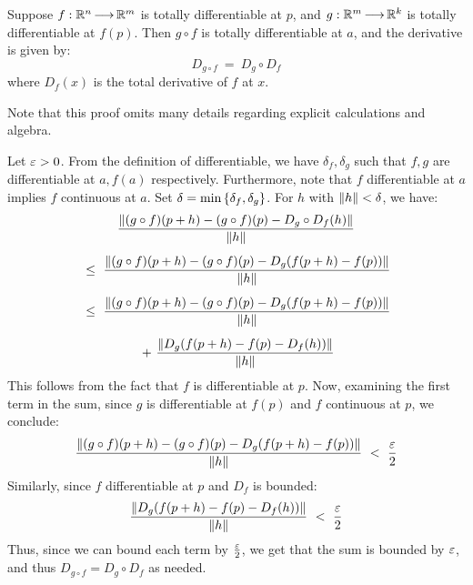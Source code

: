 \newpage
\begin{thm}[num=7.1,title=Chain Rule]
    Suppose $ f:\mathbb{R}^{n} \operatorname{\longrightarrow} \mathbb{R}^{m} $ is totally differentiable at $ p $,
    and $ g:\mathbb{R}^{m} \operatorname{\longrightarrow} \mathbb{R}^{k} $ is totally differentiable at $ f(p) $. \vsp
    Then $ g \circ f $ is totally differentiable at $ a $, and the derivative is
    given by:
    \begin{equation*}
        D_{g\circ f} \ = \ D_{g} \circ D_{f}
    \end{equation*}
    where $ D_{f}(x) $ is the total derivative of $ f $ at $ x $.
\end{thm}

Note that this proof omits many details regarding explicit calculations and
algebra.
\begin{pf}
    Let $ \operatorname{\varepsilon} > 0 $. From the definition of differentiable, we have
    $ \delta_{f}, \delta_{g} $ such that $ f, g $ are differentiable at $ a,
    f(a) $ respectively. Furthermore, note that $ f $ differentiable at $ a $
    implies $ f $ continuous at $ a $. \vsp
    Set $ \delta = \min\left\{{\delta_{f},\delta_{g}}\right\} $. For $ h $ with $ \left\|h\right\|
    < \delta $, we have:
    \begin{gather*}
        \frac{\norm{(g\circ f)(p+h)-(g\circ f)(p)-D_{g}\circ D_{f}(h)}}
        {\norm{h}} \vsp
        \ \leq \ \frac{\norm{(g\circ f)(p+h)-(g\circ f)(p)-D_{g}(f(p+h)-f(p))}}
        {\norm{h}} \vsp
        \ \leq \ \frac{\norm{(g\circ f)(p+h)-(g\circ f)(p)-D_{g}(f(p+h)-f(p))}}
        {\norm{h}} \vsp
        \ + \ \frac{\norm{D_{g}(f(p+h)-f(p) - D_{f}(h))}}{\norm{h}}
    \end{gather*}
    This follows from the fact that $ f $ is differentiable at $ p $. Now,
    examining the first term in the sum, since $ g $ is differentiable at
    $ f(p) $ and $ f $ continuous at $ p $, we conclude:
    \begin{equation*}
        \frac{\left\|(g\circ f)(p+h)-(g\circ f)(p)-D_{g}(f(p+h)-f(p))\right\|}
        {\left\|h\right\|} \ < \ \frac{\operatorname{\varepsilon}}{2}
    \end{equation*}
    Similarly, since $ f $ differentiable at $ p $ and $ D_{f} $ is bounded:
    \begin{equation*}
        \frac{\left\|D_{g}(f(p+h)-f(p) - D_{f}(h))\right\|}{\left\|h\right\|} \ < \ \frac{\operatorname{\varepsilon}}{2}
    \end{equation*}
    Thus, since we can bound each term by $ \frac{\operatorname{\varepsilon}}{2} $, we get that the sum
    is bounded by $ \operatorname{\varepsilon} $, and thus $ D_{g\circ f} = D_{g}\circ D_{f} $ as
    needed.
\end{pf}

